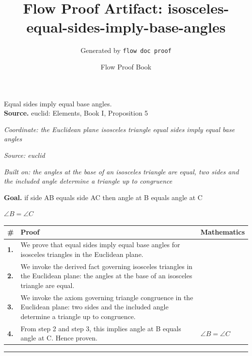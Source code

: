 \documentclass[11pt]{article}
\title{Flow Proof Artifact: isosceles-equal-sides-imply-base-angles}
\author{Generated by \texttt{flow doc proof}}
\date{Flow Proof Book}
\theoremstyle{definition}
\begin{document}
\maketitle
Equal sides imply equal base angles.\\[0.5em]
\textbf{Source.} euclid: Elements, Book I, Proposition 5\\[0.5em]
\bigskip
{}\par
\smallskip\noindent\textit{Coordinate: the Euclidean plane \cdot isosceles triangle \cdot equal sides imply equal base angles}\par
\smallskip\noindent\textit{Source: euclid}\par
\smallskip\noindent\textit{Built on: the angles at the base of an isosceles triangle are equal, two sides and the included angle determine a triangle up to congruence}\par
\medskip
\noindent\textbf{Goal.} if side AB equals side AC then angle at B equals angle at C\par
\noindent$\displaystyle \angle B = \angle C$\par
\medskip
\noindent
\begin{tabular}{@{} >{\raggedright\arraybackslash}p{} >{\raggedright\arraybackslash}p{} >{\raggedleft\arraybackslash}p{} @{}}
\textbf{\#} & \textbf{Proof} & \textbf{Mathematics} \\
\midrule
\textbf{1.} & We prove that equal sides imply equal base angles for isosceles triangles in the Euclidean plane. & \\[0.45em]
\textbf{2.} & We invoke the derived fact governing isosceles triangles in the Euclidean plane: the angles at the base of an isosceles triangle are equal. & \\[0.45em]
\textbf{3.} & We invoke the axiom governing triangle congruence in the Euclidean plane: two sides and the included angle determine a triangle up to congruence. & \\[0.45em]
\textbf{4.} & From step 2 and step 3, this implies angle at B equals angle at C. Hence proven. & $\displaystyle \angle B = \angle C$ \\[0.45em]
\bottomrule
\end{tabular}
\label{thm:Geometry-isosceles triangle-equal_sides_imply_equal_base_angles}
\par\medskip\hrule
\end{document}
